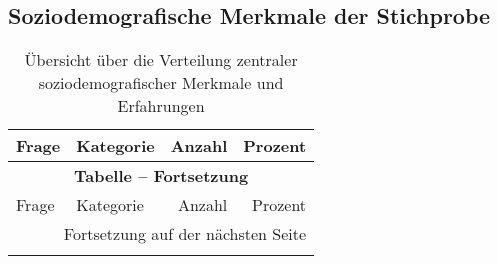 \appendix

\begin{appendices}


\section{Soziodemografische Merkmale der Stichprobe}
\label{sec:appendix_demographics}

\begin{longtable}{p{5.5cm}p{5.5cm}rr}
    \caption{Übersicht über die Verteilung zentraler soziodemografischer Merkmale und Erfahrungen}
    \label{tab:soziodemografie_gesamt}\\
    \toprule
    Frage & Kategorie & Anzahl & Prozent \\
    \midrule
    \endfirsthead

    \multicolumn{4}{c}{{\bfseries Tabelle \thetable{} -- Fortsetzung}} \\
    \toprule
    Frage & Kategorie & Anzahl & Prozent \\
    \midrule
    \endhead
    
    \midrule
    \multicolumn{4}{r}{Fortsetzung auf der nächsten Seite}\\
    \endfoot
    
    \bottomrule
    \endlastfoot


\end{longtable}
\end{appendices}

